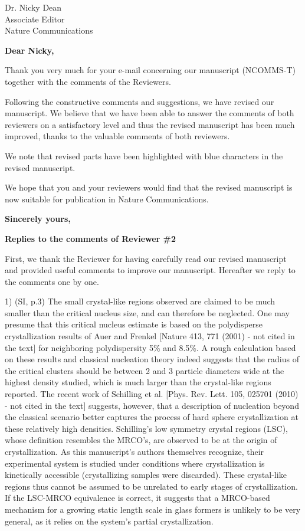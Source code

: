 \documentclass[a4paper, rebuttal, parskip=true, firsthead=false, fromemail=true, foldmarks=false]{scrlttr2}
\begin{document}
 
\begin{letter}{Dr. Nicky Dean\\
Associate Editor\\
Nature Communications}
\opening{\bf Dear Nicky,}

Thank you very much for your e-mail concerning our manuscript (NCOMMS\nobreakdash-T) together with the comments of the Reviewers. 

Following the constructive comments and suggestions, we have revised our manuscript. 
We believe that we have been able to answer the comments of both reviewers on a satisfactory level and thus the revised manuscript has been much improved, thanks to the valuable comments of both reviewers. 

We note that revised parts have been highlighted with blue characters in the revised manuscript. 

We hope that you and your reviewers would find that the revised manuscript is now suitable for publication in Nature Communications. 

\closing{\bf Sincerely yours,} 
\clearpage

\textsf{\textbf{Replies to the comments of Reviewer \#2}}

First, we thank the Reviewer for having carefully read our revised manuscript and provided useful comments to improve our manuscript. 
Hereafter we reply to the comments one by one. 

\begin{quotationi}
1) (SI, p.3) The small crystal-like regions observed are claimed to be much smaller than the critical nucleus size, and can therefore be neglected. One may presume that this critical nucleus estimate is based on the polydisperse crystallization results of Auer and Frenkel [Nature 413, 771 (2001) - not cited in the text] for neighboring polydispersity 5\% and 8.5\%. A rough calculation based on these results and classical nucleation theory indeed suggests that the radius of the critical clusters should be between 2 and 3 particle diameters wide at the highest density studied, which is much larger than the crystal-like regions reported. The recent work of Schilling et al. [Phys. Rev. Lett. 105, 025701 (2010) - not cited in the text] suggests, however, that a description of nucleation beyond the classical scenario better captures the process of hard sphere crystallization at these relatively high densities. Schilling's low symmetry crystal regions (LSC), whose definition resembles the MRCO's, are observed to be at the origin of crystallization. As this manuscript's authors themselves recognize, their experimental system is studied under conditions where crystallization is kinetically accessible (crystallizing samples were discarded). These crystal-like regions thus cannot be assumed to be unrelated to early stages of crystallization. If the LSC-MRCO equivalence is correct, it suggests that a MRCO-based mechanism for a growing static length scale in glass formers is unlikely to be very general, as it relies on the system's partial crystallization.
\end{quotationi}


\end{letter}
\end{document}
